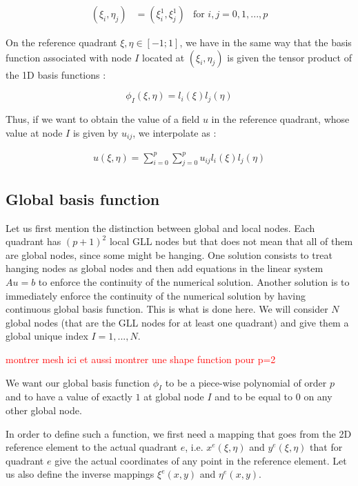 \begin{align*}
(\xi_i, \eta_j) &= (\xi^1_i,\xi^1_j) &\text{for $i,j=0,1,...,p$}
\end{align*}

On the reference quadrant $\xi, \eta \in [-1;1]$, we have in the same way that the basis function associated with node $I$ located at $(\xi_i,\eta_j)$ is given the tensor product of the 1D basis functions : 

$$\phi_I(\xi,\eta) = l_i(\xi)l_j(\eta)$$

Thus, if we want to obtain the value of a field $u$ in the reference quadrant, whose value at node $I$ is given by $u_{ij}$, we interpolate as : 

\begin{align*}
u(\xi,\eta) = \sum_{i=0}^p\sum_{j=0}^p u_{ij}l_i(\xi)l_j(\eta)
\end{align*}

\subsection{Global basis function}

Let us first mention the distinction between global and local nodes. Each quadrant has $(p+1)^2$ local GLL nodes but that does not mean that all of them are global nodes, since some might be hanging. One solution consists to treat hanging nodes as global nodes and then add equations in the linear system $Au=b$ to enforce the continuity of the numerical solution. Another solution is to immediately enforce the continuity of the numerical solution by having continuous global basis function. This is what is done here. We will consider $N$ global nodes (that are the GLL nodes for at least one quadrant) and give them a global unique index $I = 1,...,N$. 

\textcolor{red}{montrer mesh ici et aussi montrer une shape function pour p=2}


We want our global basis function $\phi_I$ to be a piece-wise polynomial of order $p$ and to have a value of exactly $1$ at global node $I$ and to be equal to $0$ on any other global node. 

In order to define such a function, we first need a mapping that goes from the 2D reference element to the actual quadrant $e$, i.e. $x^e(\xi,\eta)$ and $y^e(\xi,\eta)$ that for quadrant $e$ give the actual coordinates of any point in the reference element. Let us also define the inverse mappings $\xi^e(x,y)$ and $\eta^e(x,y)$. 

